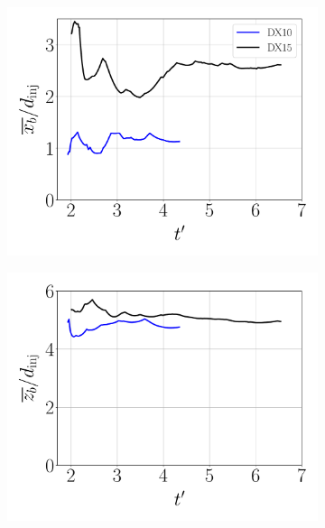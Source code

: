 \begin{figure}[ht]
\flushleft
\begin{subfigure}[b]{0.3\textwidth}
	\flushleft
   \includegraphics[scale=0.225]{./part3_applications/figures_ch8_resolved/results_dense_core_modeling/convergence_mean_xb}
\end{subfigure}
\hfill
\begin{subfigure}[b]{0.3\textwidth}
	\flushleft
   \includegraphics[scale=0.225]{./part3_applications/figures_ch8_resolved/results_dense_core_modeling/convergence_mean_zb}
\end{subfigure}
\hfill
\begin{subfigure}[b]{0.3\textwidth}

\end{subfigure}
\end{figure}
